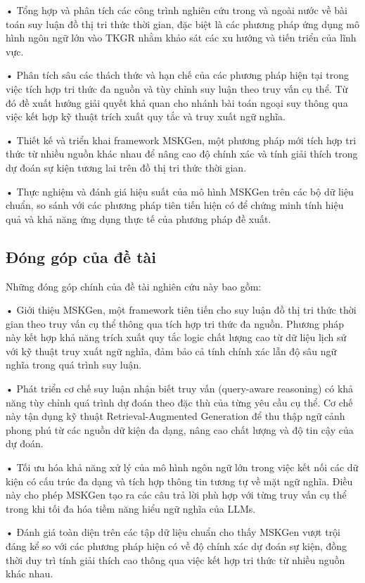 • Tổng hợp và phân tích các công trình nghiên cứu trong và ngoài nước về bài toán suy luận đồ thị tri thức thời gian, đặc biệt là các phương pháp ứng dụng mô hình ngôn ngữ lớn vào TKGR nhằm khảo sát các xu hướng và tiến triển của lĩnh vực.

• Phân tích sâu các thách thức và hạn chế của các phương pháp hiện tại trong việc tích hợp tri thức đa nguồn và tùy chỉnh suy luận theo truy vấn cụ thể. Từ đó đề xuất hướng giải quyết khả quan cho nhánh bài toán ngoại suy thông qua việc kết hợp kỹ thuật trích xuất quy tắc và truy xuất ngữ nghĩa.

• Thiết kế và triển khai framework MSKGen, một phương pháp mới tích hợp tri thức từ nhiều nguồn khác nhau để nâng cao độ chính xác và tính giải thích trong dự đoán sự kiện tương lai trên đồ thị tri thức thời gian.

• Thực nghiệm và đánh giá hiệu suất của mô hình MSKGen trên các bộ dữ liệu chuẩn, so sánh với các phương pháp tiên tiến hiện có để chứng minh tính hiệu quả và khả năng ứng dụng thực tế của phương pháp đề xuất.

\subsection{Đóng góp của đề tài}
Những đóng góp chính của đề tài nghiên cứu này bao gồm:

• Giới thiệu MSKGen, một framework tiên tiến cho suy luận đồ thị tri thức thời gian theo truy vấn cụ thể thông qua tích hợp tri thức đa nguồn. Phương pháp này kết hợp khả năng trích xuất quy tắc logic chất lượng cao từ dữ liệu lịch sử với kỹ thuật truy xuất ngữ nghĩa, đảm bảo cả tính chính xác lẫn độ sâu ngữ nghĩa trong quá trình suy luận.

• Phát triển cơ chế suy luận nhận biết truy vấn (query-aware reasoning) có khả năng tùy chỉnh quá trình dự đoán theo đặc thù của từng yêu cầu cụ thể. Cơ chế này tận dụng kỹ thuật Retrieval-Augmented Generation để thu thập ngữ cảnh phong phú từ các nguồn dữ kiện đa dạng, nâng cao chất lượng và độ tin cậy của dự đoán.

• Tối ưu hóa khả năng xử lý của mô hình ngôn ngữ lớn trong việc kết nối các dữ kiện có cấu trúc đa dạng và tích hợp thông tin tương tự về mặt ngữ nghĩa. Điều này cho phép MSKGen tạo ra các câu trả lời phù hợp với từng truy vấn cụ thể trong khi tối đa hóa tiềm năng hiểu ngữ nghĩa của LLMs.

• Đánh giá toàn diện trên các tập dữ liệu chuẩn cho thấy MSKGen vượt trội đáng kể so với các phương pháp hiện có về độ chính xác dự đoán sự kiện, đồng thời duy trì tính giải thích cao thông qua việc kết hợp tri thức từ nhiều nguồn khác nhau.

